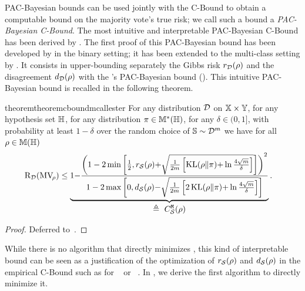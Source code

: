 PAC-Bayesian bounds can be used jointly with the C-Bound to obtain a computable bound on the majority vote's true risk; we call such a bound a {\it PAC-Bayesian C-Bound}.
The most intuitive and interpretable PAC-Bayesian C-Bound has been derived by \citet{RoyMarchandLaviolette2016,LavioletteMorvantRalaivolaRoy2017}.
The first proof of this PAC-Bayesian bound has been developed by \citep{RoyMarchandLaviolette2016} in the binary setting; it has been extended to the multi-class setting by \citet[Theorem~3]{LavioletteMorvantRalaivolaRoy2017}.
It consists in upper-bounding separately the Gibbs risk $r_{\mathcal{D}}(\rho)$ and the disagreement $d_{\mathcal{D}}(\rho)$ with the \citeauthor{McAllester2003}'s PAC-Bayesian bound ().
This intuitive PAC-Bayesian bound is recalled in the following theorem.

\begin{restatable}{theorem}{theoremcboundmcallester}\label{chap:mv:theorem:cbound-mcallester}
For any distribution $\mathcal{D}$ on $\mathbb{X}\times\mathbb{Y}$, for any hypothesis set $\mathbb{H}$, for any distribution $\pi\in\mathbb{M}^{*}(\mathbb{H})$, for any $\delta\in(0,1]$, with probability at least $1-\delta$ over the random choice of $\mathbb{S}\sim\mathcal{D}^m$ we have for all $\rho\in\mathbb{M}(\mathbb{H})$
\begin{align}
 &\Risk_{\D}(\MVQ) \le \underbrace{1{-}\frac{\LP 1-2\min\LB\frac{1}{2},r_{\dS}(\Q){+}\sqrt{\frac{1}{2\m}\LB \KL(\Q\|\P){+}\ln\tfrac{4\sqrt{\m}}{\delta}\RB}\RB\RP^2}{1-2\max\LB 0, d_{\dS}(\Q){-}\sqrt{\frac{1}{2\m}\LB 2\KL(\Q\|\P){+}\ln\tfrac{4\sqrt{\m}}{\delta}\RB}\RB}}_{{\displaystyle\defeq\ \MCBound}}.\label{chap:mv:eq:cbound-mcallester}
\end{align}
\end{restatable}
\begin{noaddcontents}\begin{proof}
Deferred to~.
\end{proof}\end{noaddcontents}

While there is no algorithm that directly minimizes , this kind of interpretable bound can be seen as a justification of the optimization of $r_{\mathcal{S}}(\rho)$ and $d_{\mathcal{S}}(\rho)$ in the empirical C-Bound such as for \mincq~\citep{RoyLavioletteMarchand2011} or \cbboost~\citep{BauvinCapponiRoyLaviolette2020}.
In , we derive the first algorithm to directly minimize it.

